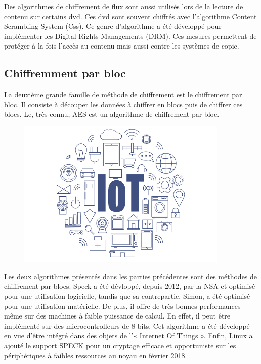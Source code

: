 			Des algorithmes de chiffrement de flux sont aussi utilisés lors de la lecture de contenu sur certains dvd. Ces dvd sont souvent chiffrés avec l'algorithme Content Scrambling System (Css).
			Ce genre d'algorithme a été développé pour implémenter les Digital Rights Managements (DRM). Ces mesures permettent de protéger à la fois l'accès au contenu mais aussi contre les systèmes de copie.
			
			\subsection{Chiffremment par bloc}
			
			La deuxième grande famille de méthode de chiffrement est le chiffrement par bloc. Il consiste à découper les données à chiffrer en blocs puis de chiffrer ces blocs.
			Le, très connu, AES est un algorithme de chiffrement par bloc.
			
			\begin{figure}[!h]
				\centering
				\includegraphics[width=0.9\textwidth]{imgs/application/IOT.jpg}
				\label{IOT}
			\end{figure}
			
			Les deux algorithmes présentés dans les parties précédentes sont des méthodes de chiffrement par blocs.
			Speck a été dévloppé, depuis 2012, par la NSA et optimisé pour une utilisation logicielle, tandis que sa contrepartie, Simon, a été optimisé pour une utilisation matérielle.
			De plus, il offre de très bonnes performances même sur des machines à faible puissance de calcul.
			En effet, il peut être implémenté sur des microcontrolleurs de 8 bits.
			Cet algorithme a été développé en vue d'être intégré dans des objets de l'« Internet Of Things ».
			Enfin, Linux a ajouté le support SPECK pour un cryptage efficace et opportuniste sur les périphériques à faibles ressources au noyau en février 2018.
			
